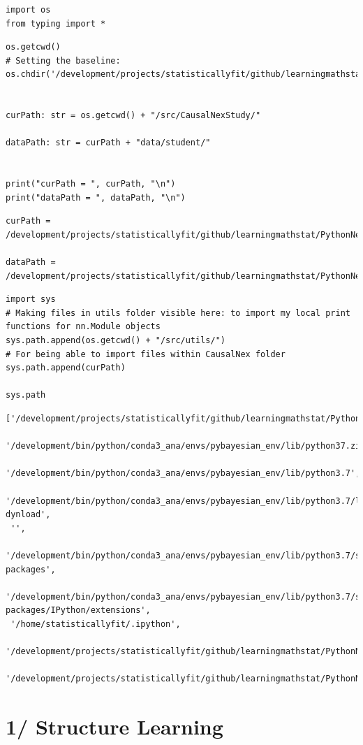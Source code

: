 \documentclass[
]{article}
\author{}
\date{}
\begin{document}
\begin{verbatim}
import os
from typing import *
\end{verbatim}

\begin{verbatim}
os.getcwd()
# Setting the baseline:
os.chdir('/development/projects/statisticallyfit/github/learningmathstat/PythonNeuralNetNLP')


curPath: str = os.getcwd() + "/src/CausalNexStudy/"

dataPath: str = curPath + "data/student/"


print("curPath = ", curPath, "\n")
print("dataPath = ", dataPath, "\n")
\end{verbatim}

\begin{verbatim}
curPath =  /development/projects/statisticallyfit/github/learningmathstat/PythonNeuralNetNLP/src/CausalNexStudy/ 

dataPath =  /development/projects/statisticallyfit/github/learningmathstat/PythonNeuralNetNLP/src/CausalNexStudy/data/student/ 
\end{verbatim}

\begin{verbatim}
import sys
# Making files in utils folder visible here: to import my local print functions for nn.Module objects
sys.path.append(os.getcwd() + "/src/utils/")
# For being able to import files within CausalNex folder
sys.path.append(curPath)

sys.path
\end{verbatim}

\begin{verbatim}
['/development/projects/statisticallyfit/github/learningmathstat/PythonNeuralNetNLP/src/CausalNexStudy',
 '/development/bin/python/conda3_ana/envs/pybayesian_env/lib/python37.zip',
 '/development/bin/python/conda3_ana/envs/pybayesian_env/lib/python3.7',
 '/development/bin/python/conda3_ana/envs/pybayesian_env/lib/python3.7/lib-dynload',
 '',
 '/development/bin/python/conda3_ana/envs/pybayesian_env/lib/python3.7/site-packages',
 '/development/bin/python/conda3_ana/envs/pybayesian_env/lib/python3.7/site-packages/IPython/extensions',
 '/home/statisticallyfit/.ipython',
 '/development/projects/statisticallyfit/github/learningmathstat/PythonNeuralNetNLP/src/utils/',
 '/development/projects/statisticallyfit/github/learningmathstat/PythonNeuralNetNLP/src/CausalNexStudy/']
\end{verbatim}

\hypertarget{structure-learning}{%
\section{1/ Structure Learning}\label{structure-learning}}
\end{document}
